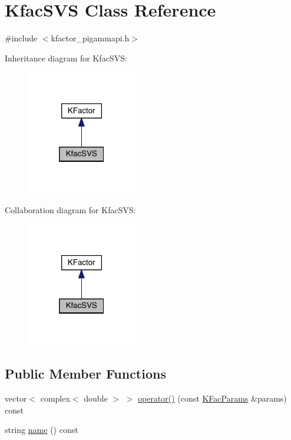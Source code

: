 \hypertarget{classKfacSVS}{}\section{Kfac\+S\+VS Class Reference}
\label{classKfacSVS}


{\ttfamily \#include $<$kfactor\+\_\+pigammapi.\+h$>$}



Inheritance diagram for Kfac\+S\+VS\+:\nopagebreak
\begin{figure}[H]
\begin{center}
\leavevmode
\includegraphics[width=136pt]{d9/df2/classKfacSVS__inherit__graph}
\end{center}
\end{figure}


Collaboration diagram for Kfac\+S\+VS\+:\nopagebreak
\begin{figure}[H]
\begin{center}
\leavevmode
\includegraphics[width=136pt]{d2/dc7/classKfacSVS__coll__graph}
\end{center}
\end{figure}
\subsection*{Public Member Functions}
\begin{DoxyCompactItemize}
\item 
vector$<$ complex$<$ double $>$ $>$ \mbox{\hyperlink{classKfacSVS_a1bcfae29380c602c7040ad790ccff63f}{operator()}} (const \mbox{\hyperlink{classKFacParams}{K\+Fac\+Params}} \&params) const
\item 
string \mbox{\hyperlink{classKfacSVS_af7a1fd20af79d6a2f844cf4418a5eeb8}{name}} () const
\end{DoxyCompactItemize}


